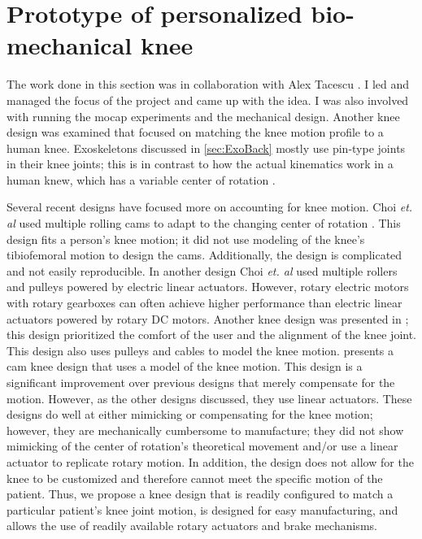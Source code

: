 \section{Prototype of personalized bio-mechanical knee}

The work done in this section was in collaboration with Alex Tacescu \cite{tacescu2021development}. I led and managed the focus of the project and came up with the idea. I was also involved with running the mocap experiments and the mechanical design. Another knee design was examined that focused on matching the knee motion profile to a human knee. Exoskeletons discussed in \autoref{sec:ExoBack} mostly use pin-type joints in their knee joints; this is in contrast to how the actual kinematics work in a human knew, which has a variable center of rotation \cite{morrison1970mechanics} \cite{koo2008knee}.

Several recent designs have focused more on accounting for knee motion. Choi \textit{et. al} used multiple rolling cams to adapt to the changing center of rotation \cite{choi2017development}. This design fits a person's knee motion; it did not use modeling of the knee's tibiofemoral motion to design the cams. Additionally, the design is complicated and not easily reproducible. In another design Choi \textit{et. al} used multiple rollers and pulleys powered by electric linear actuators. However, rotary electric motors with rotary gearboxes can often achieve higher performance than electric linear actuators powered by rotary DC motors. Another knee design was presented in \cite{wang2018comfort}; this design prioritized the comfort of the user and the alignment of the knee joint. This design also uses pulleys and cables to model the knee motion. \cite{AdaptiveKneeJoint} presents a cam knee design that uses a model of the knee motion. This design is a significant improvement over previous designs that merely compensate for the motion. However, as the other designs discussed, they use linear actuators.  These designs do well at either mimicking or compensating for the knee motion; however, they are mechanically cumbersome to manufacture; they did not show mimicking of the center of rotation's theoretical movement and/or use a linear actuator to replicate rotary motion. In addition, the design does not allow for the knee to be customized and therefore cannot meet the specific motion of the patient. Thus, we propose a knee design that is readily configured to match a particular patient's knee joint motion, is designed for easy manufacturing, and allows the use of readily available rotary actuators and brake mechanisms.

